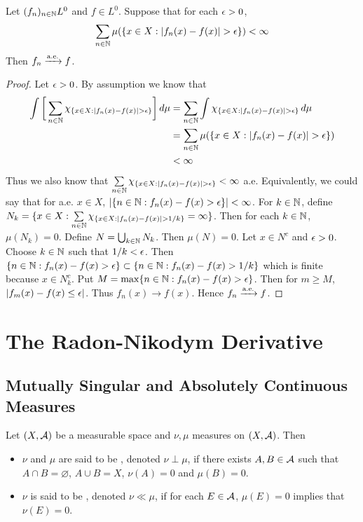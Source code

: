 \documentclass{book}
\begin{document}
	
	\begin{ex}  
		Let $(f_n)_{n \in \mathbb{N}} L^0$ and $f \in L^0$. Suppose that for each $\epsilon >0$, $$\sum\limits_{n \in \mathbb{N}}\mu(\{x \in X: |f_n(x)-f(x)| > \epsilon\}) < \infty$$
		Then $f_n \xrightarrow{\text{a.e.}} f$.
	\end{ex}
	
	\begin{proof}
		Let $\epsilon>0$. By assumption we know that
		\begin{align*}
			\int \bigg[ \sum\limits_{n \in \mathbb{N}}\chi_{\{x \in X: |f_n(x)-f(x)| > \epsilon\}}\bigg] \, d \mu 
			&= \sum\limits_{n \in \mathbb{N}}\int \chi_{\{x \in X: |f_n(x)-f(x)| > \epsilon\}}\, d \mu\\
			&=\sum\limits_{n \in \mathbb{N}}\mu(\{x \in X: |f_n(x)-f(x)| > \epsilon\})\\
			& < \infty
		\end{align*}
		Thus we also know that $\sum\limits_{n \in \mathbb{N}}\chi_{\{x \in X: |f_n(x)-f(x)| > \epsilon\}} < \infty$ a.e. Equivalently, we could say that for a.e. $x \in X$, $|\{n \in \mathbb{N}: f_n(x) - f(x) > \epsilon\}| < \infty$. For $k \in \mathbb{N}$, define $N_k = \{x \in X: \sum\limits_{n \in \mathbb{N}}\chi_{\{x \in X: |f_n(x)-f(x)| > 1/k\}} = \infty\}$. Then for each $k \in \mathbb{N}$, $\mu(N_k) = 0$. Define $N = \bigcup_{k \in \mathbb{N}} N_k$. Then $\mu(N) = 0$. Let $x \in N^c$ and $\epsilon > 0$. Choose $k \in \mathbb{N}$ such that $1/k < \epsilon$. Then $\{n \in \mathbb{N}: f_n(x) - f(x) > \epsilon\} \subset \{n \in \mathbb{N}: f_n(x) - f(x) > 1/k\}$ which is finite because $x \in N_k^c$. Put $M = \max\{n \in \mathbb{N}: f_n(x) - f(x) > \epsilon\}$. Then for $m \geq M$, $|f_m(x) - f(x) \leq \epsilon|$. Thus $f_n(x) \rightarrow f(x)$. Hence $f_n \xrightarrow{\text{a.e.}} f$.
	\end{proof}
	
	
	
	
	
	
	
	
	
	
	
	
	
	\newpage
	\chapter{The Radon-Nikodym Derivative}
	
	\section{Mutually Singular and Absolutely Continuous Measures}
	
	\begin{defn} 
		Let $(X, \mathcal{A})$ be a measurable space and $\nu, \mu$ measures on $(X, \mathcal{A})$. Then 
		\begin{itemize}
			\item $\nu$ and $\mu$ are said to be , denoted $\nu \perp \mu$, if there exists $A,B \in \mathcal{A}$ such that $A \cap B = \varnothing$, $A \cup B = X$, $\nu(A) = 0$ and $\mu(B) = 0$. 
			\item $\nu$ is said to be , denoted $\nu \ll \mu$, if for each $E \in \mathcal{A}$, $\mu(E) = 0$ implies that $\nu(E) = 0$.
		\end{itemize}
	\end{defn}
\end{document}
